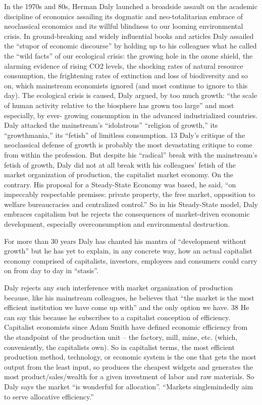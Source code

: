 \documentclass[
]{book}
\begin{document}
In the 1970s and 80s, Herman Daly launched a broadside assault on the academic
discipline of economics assailing its dogmatic and neo-totalitarian embrace of
neoclassical economics and its willful blindness to our looming environmental
crisis. In ground-breaking and widely influential books and articles Daly assailed the
``stupor of economic discourse'' by holding up to his colleagues what he called the
``wild facts'' of our ecological crisis: the growing hole in the ozone shield, the
alarming evidence of rising CO2 levels, the shocking rates of natural resource
consumption, the frightening rates of extinction and loss of biodiversity and so on,
which mainstream economists ignored (and most continue to ignore to this day). The
ecological crisis is caused, Daly argued, by too much growth: ``the scale of human
activity relative to the biosphere has grown too large'' and most especially, by ever-
growing consumption in the advanced industrialized countries. Daly attacked the
mainstream's ``idolatrous'' ``religion of growth,'' its ``growthmania,'' its ``fetish'' of
limitless consumption. 13 Daly's critique of the neoclassical defense of growth is
probably the most devastating critique to come from within the profession.
But despite his ``radical'' break with the mainstream's fetish of growth, Daly did not
at all break with his colleagues' fetish of the market organization of production, the
capitalist market economy. On the contrary. His proposal for a Steady-State
Economy was based, he said, ``on impeccably respectable premises: private
property, the free market, opposition to welfare bureaucracies and centralized
control.'' So in his Steady-State model, Daly embraces capitalism but he rejects the
consequences of market-driven economic development, especially overconsumption
and environmental destruction.

For more than 30 years Daly has chanted his mantra of ``development without
growth'' but he has yet to explain, in any concrete way, how an actual capitalist
economy comprised of capitalists, investors, employees and consumers could carry
on from day to day in ``stasis''.

Daly rejects any such interference with market organization of production because,
like his mainstream colleagues, he believes that ``the market is the most efficient
institution we have come up with'' and the only option we have. 38 He can say this
because he subscribes to a capitalist conception of efficiency. Capitalist economists
since Adam Smith have defined economic efficiency from the standpoint of the
production unit -- the factory, mill, mine, etc. (which, conveniently, the capitalists
own). So in capitalist terms, the most efficient production method, technology, or
economic system is the one that gets the most output from the least input, so
produces the cheapest widgets and generates the most product/sales/wealth for a
given investment of labor and raw materials. So Daly says the market ``is wonderful
for allocation''. ``Markets singlemindedly aim to serve allocative efficiency.''
\end{document}
